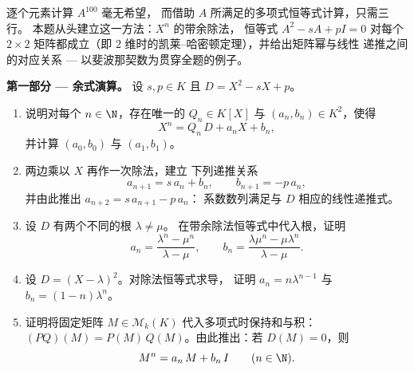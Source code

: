 \begin{problem}\label{pb:b1:matrices:1}
逐个元素计算 $A^{100}$ 毫无希望，
而借助 $A$ 所满足的多项式恒等式计算，只需三行。
本题从头建立这一方法：$X^n$ 的带余除法，
恒等式 $A^2 - sA + pI = 0$ 对每个 $2
\times 2$ 矩阵都成立（即
$2$ 维时的凯莱–哈密顿定理），并给出矩阵幂与线性
递推之间的对应关系 --- 以斐波那契数为贯穿全题的例子。

\medskip
\noindent\textbf{第一部分 --- 余式演算。} 设 $s, p
\in K$ 且 $D = X^2 - sX + p$。
\begin{enumerate}
  \item 说明对每个 $n \in \N$，存在唯一的 $Q_n
        \in K[X]$ 与 $(a_n, b_n) \in K^2$，使得
        \[
        X^n = Q_n\,D + a_n X + b_n ,
        \]
        并计算 $(a_0, b_0)$ 与 $(a_1, b_1)$。
  \item 两边乘以 $X$ 再作一次除法，建立
        下列递推关系
        \[
        a_{n+1} = s\,a_n + b_n,
        \qquad
        b_{n+1} = -p\,a_n ,
        \]
        并由此推出 $a_{n+2} = s\,a_{n+1} - p\,a_n$：
        系数数列满足与
        $D$ 相应的线性递推式。
  \item 设 $D$ 有两个不同的根 $\lambda \neq \mu$。
        在带余除法恒等式中代入根，证明
        \[
        a_n = \frac{\lambda^n - \mu^n}{\lambda - \mu},
        \qquad
        b_n = \frac{\lambda\mu^n - \mu\lambda^n}{\lambda - \mu} .
        \]
  \item 设 $D = (X - \lambda)^2$。对除法恒等式求导，
        证明 $a_n = n\lambda^{n-1}$ 与
        $b_n = (1 - n)\lambda^{n}$。
  \item 证明将固定矩阵 $M \in
        \mathcal{M}_k(K)$ 代入多项式时保持和与积：
        $(PQ)(M) = P(M)\,Q(M)$。由此推出：若 $D(M) =
        0$，则
        \[
        M^n = a_n\,M + b_n\,I \qquad (n \in \N).
        \]
\end{enumerate}


\end{problem}
